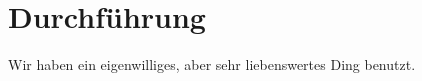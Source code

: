 \section{Durchführung} %
\label{sec:durchfhrung}

Wir haben ein eigenwilliges, aber sehr liebenswertes Ding benutzt.
